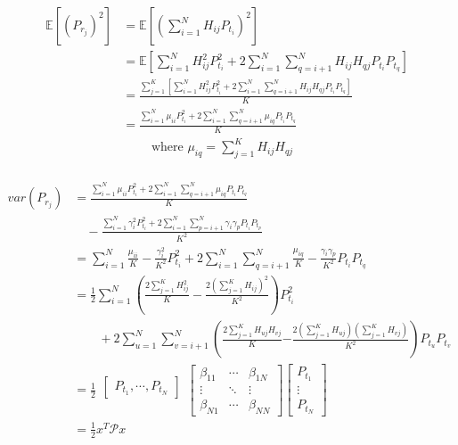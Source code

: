 \documentclass[slidestop,usepdftitle=false]{gvvslides}
\providecommand{\sbrak}[1]{\ensuremath{{}\left[#1\right]}}
\providecommand{\brak}[1]{\ensuremath{\left(#1\right)}}
\providecommand{\lbrak}[1]{\ensuremath{\left(#1\right.}}
\providecommand{\rbrak}[1]{\ensuremath{\left.#1\right)}}
\begin{document}
\begin{frame}
\footnotesize{
\begin{align}
\mathbb{E}\sbrak{\brak{P_{r_j}}^2}&=\mathbb{E}\sbrak{\brak{\sum_{i=1}^NH_{ij}P_{t_i}}^2}\\ \nonumber
&=\mathbb{E}\sbrak{\sum_{i=1}^N H_{ij}^2P_{t_i}^2 + 2 \sum_{i=1}^N \sum_{q=i+1}^{N} H_{ij}H_{qj}P_{t_i}P_{t_q}}\\ \nonumber
&=\frac{\sum_{j=1}^K\sbrak{\sum_{i=1}^N H_{ij}^2P_{t_i}^2 + 2 \sum_{i=1}^N \sum_{q=i+1}^{N} H_{ij}H_{qj}P_{t_i}P_{t_q}}}{K}\\ \nonumber
&=\frac{\sum_{i=1}^N \mu_{ii} P_{t_i}^2 + 2 \sum_{i=1}^N \sum_{q=i+1}^{N} \mu_{iq} P_{t_i}P_{t_q}}{K}\\
&\qquad \text{ where } \mu_{iq}=\sum_{j=1}^KH_{ij}H_{qj}\\ \nonumber
\end{align}
}
\end{frame}
\begin{frame}
\footnotesize{
\begin{align}
var(P_{r_j})&=\frac{\sum_{i=1}^N \mu_{ii} P_{t_i}^2 + 2 \sum_{i=1}^N \sum_{q=i+1}^{N} \mu_{iq} P_{t_i}P_{t_q}}{K} \nonumber \\
             & \quad- \frac{\sum_{i=1}^N\gamma_i^2P_{t_i}^2+2\sum_{i=1}^N\sum_{p=i+1}^{N}\gamma_i\gamma_pP_{t_i}P_{t_p}}{K^2}  \nonumber \\
            &=\sum_{i=1}^N \frac{\mu_{ii}}{K}-\frac{\gamma_i^2}{K^2} P_{t_i}^2 + 2 \sum_{i=1}^N \sum_{q=i+1}^{N} \frac{\mu_{iq}}{K}-\frac{\gamma_i\gamma_p}{K^2} P_{t_i}P_{t_q} \nonumber \\
            &=\frac{1}{2}\sum_{i=1}^N \brak{\frac{2\sum_{j=1}^KH_{ij}^2}{K}-\frac{2\brak{\sum_{j=1}^KH_{ij}}^2}{K^2}} P_{t_i}^2 \nonumber \\
            &\qquad + 2 \sum_{u=1}^N \sum_{v=i+1}^{N} \lbrak{\frac{2\sum_{j=1}^KH_{uj}H_{vj}}{K} } \rbrak{-\frac{2\brak{\sum_{j=1}^KH_{uj}}\brak{\sum_{j=1}^KH_{vj}}}{K^2}} P_{t_u}P_{t_v} \nonumber \\
            &=\frac{1}{2}\begin{matrix}\begin{bmatrix}P_{t_1},\cdots,P_{t_N}\end{bmatrix}\\\mbox{}\end{matrix}
				\begin{bmatrix} \beta_{11}& \cdots &\beta_{1N} \\
								\vdots &\ddots &\vdots  \\
								\beta_{N1}& \cdots &\beta_{NN}  
								\end{bmatrix} 
				\begin{bmatrix} P_{t_1} \\ \vdots \\ P_{t_N} \end{bmatrix} \nonumber \\
			&=\frac{1}{2}x^T\mathcal{P}x
\end{align}
}
\end{frame}
\end{document}
